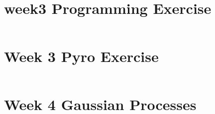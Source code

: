 \newpage
\section{week3 Programming Exercise}
\label{sec:week3:code:exercise}
\inputminted{Python}{../src/week3_exercise.py}

\newpage
\section{Week 3 Pyro Exercise}
\label{sec:week3:code:pyro}
\inputminted{Python}{../src/week3_pyro.py}

\newpage
\section{Week 4 Gaussian Processes}
\label{sec:week4:code:gp}
\inputminted{Python}{../src/week4_gp.py}
